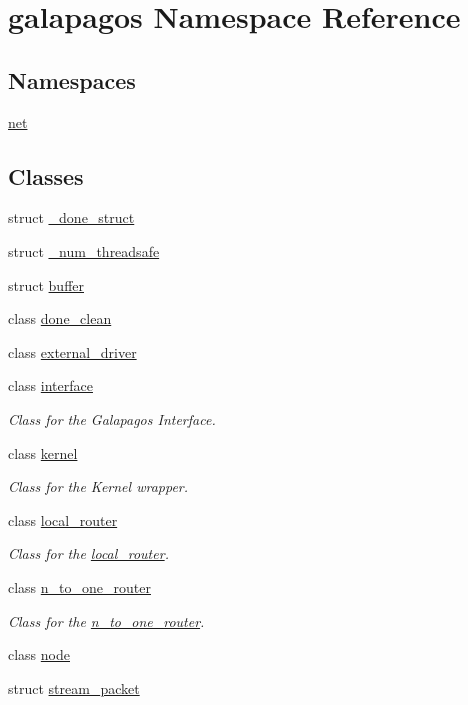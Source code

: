 \hypertarget{namespacegalapagos}{}\section{galapagos Namespace Reference}
\label{namespacegalapagos}
\subsection*{Namespaces}
\begin{DoxyCompactItemize}
\item 
 \hyperlink{namespacegalapagos_1_1net}{net}
\end{DoxyCompactItemize}
\subsection*{Classes}
\begin{DoxyCompactItemize}
\item 
struct \hyperlink{structgalapagos_1_1__done__struct}{\+\_\+done\+\_\+struct}
\item 
struct \hyperlink{structgalapagos_1_1__num__threadsafe}{\+\_\+num\+\_\+threadsafe}
\item 
struct \hyperlink{structgalapagos_1_1buffer}{buffer}
\item 
class \hyperlink{classgalapagos_1_1done__clean}{done\+\_\+clean}
\item 
class \hyperlink{classgalapagos_1_1external__driver}{external\+\_\+driver}
\item 
class \hyperlink{classgalapagos_1_1interface}{interface}
\begin{DoxyCompactList}\small\item\em Class for the Galapagos Interface. \end{DoxyCompactList}\item 
class \hyperlink{classgalapagos_1_1kernel}{kernel}
\begin{DoxyCompactList}\small\item\em Class for the Kernel wrapper. \end{DoxyCompactList}\item 
class \hyperlink{classgalapagos_1_1local__router}{local\+\_\+router}
\begin{DoxyCompactList}\small\item\em Class for the \hyperlink{classgalapagos_1_1local__router}{local\+\_\+router}. \end{DoxyCompactList}\item 
class \hyperlink{classgalapagos_1_1n__to__one__router}{n\+\_\+to\+\_\+one\+\_\+router}
\begin{DoxyCompactList}\small\item\em Class for the \hyperlink{classgalapagos_1_1n__to__one__router}{n\+\_\+to\+\_\+one\+\_\+router}. \end{DoxyCompactList}\item 
class \hyperlink{classgalapagos_1_1node}{node}
\item 
struct \hyperlink{structgalapagos_1_1stream__packet}{stream\+\_\+packet}
\end{DoxyCompactItemize}
